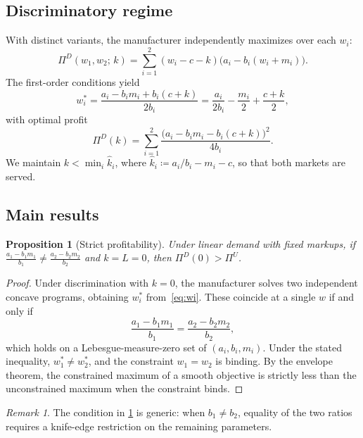 \documentclass[11pt,a4paper]{article}
\theoremstyle{plain}
\newtheorem{proposition}[theorem]{Proposition}
\theoremstyle{definition}
\theoremstyle{remark}
\newtheorem{remark}[theorem]{Remark}
\begin{document}
\subsection{Discriminatory regime}\label{sec:discrim}

With distinct variants, the manufacturer independently maximizes over each $w_i$:
\begin{equation}\label{eq:pi_d_fn}
  \Pi^D(w_1,w_2;\,k) = \sum_{i=1}^{2}(w_i - c - k)\bigl(a_i - b_i(w_i + m_i)\bigr).
\end{equation}
The first-order conditions yield
\begin{equation}\label{eq:wi}
  w_i^* = \frac{a_i - b_i m_i + b_i(c+k)}{2b_i} = \frac{a_i}{2b_i} - \frac{m_i}{2} + \frac{c+k}{2},
\end{equation}
with optimal profit
\begin{equation}\label{eq:pi_d}
  \Pi^D(k) = \sum_{i=1}^{2}\frac{\bigl(a_i - b_i m_i - b_i(c+k)\bigr)^2}{4b_i}.
\end{equation}
We maintain $k < \min_i\hat{k}_i$, where $\hat{k}_i \coloneqq a_i/b_i - m_i - c$, so that both markets are served.

\subsection{Main results}

\begin{proposition}[Strict profitability]\label{prop:profit}
Under linear demand with fixed markups, if\/
$\frac{a_1 - b_1 m_1}{b_1} \ne \frac{a_2 - b_2 m_2}{b_2}$
and $k=L=0$, then $\Pi^D(0) > \Pi^U$.
\end{proposition}

\begin{proof}
Under discrimination with $k=0$, the manufacturer solves two independent concave programs, obtaining $w_i^*$ from~\eqref{eq:wi}.
These coincide at a single $w$ if and only if
\[
  \frac{a_1 - b_1 m_1}{b_1} = \frac{a_2 - b_2 m_2}{b_2},
\]
which holds on a Lebesgue-measure-zero set of $(a_i,b_i,m_i)$.
Under the stated inequality, $w_1^*\ne w_2^*$, and the constraint $w_1=w_2$ is binding.
By the envelope theorem, the constrained maximum of a smooth objective is strictly less than the unconstrained maximum when the constraint binds.
\end{proof}

\begin{remark}\label{rem:generic}
The condition in \cref{prop:profit} is generic: when $b_1\ne b_2$, equality of the two ratios requires a knife-edge restriction on the remaining parameters.
\end{remark}
\end{document}
